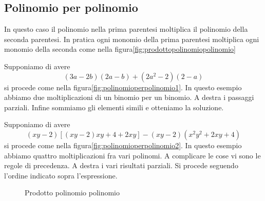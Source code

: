 \subsection{Polinomio per polinomio}
In questo caso il polinomio nella prima parentesi moltiplica il polinomio della seconda parentesi. In pratica ogni monomio della prima parentesi moltiplica ogni monomio della seconda come nella figura\nobs\vref{fig:prodottopolinomiopolinomio}

Supponiamo di avere \[(3a-2b)(2a-b)+(2a^2-2)(2-a)\]
si  procede come nella figura\nobs\vref{fig:polinomioperpolinomio1}. In questo esempio abbiamo due moltiplicazioni di un binomio per un binomio. A destra i passaggi parziali. Infine sommiamo  gli elementi simili e otteniamo la soluzione.


Supponiamo di avere \[(xy-2)[(xy-2)xy+4+2xy]-(xy-2)(x^2y^2+2xy+4)\]
si  procede come nella figura\nobs\vref{fig:polinomioperpolinomio2}. In questo esempio abbiamo quattro moltiplicazioni  fra vari polinomi. A complicare le cose vi sono le regole di precedenza. A destra i vari risultati parziali. Si procede seguendo l'ordine indicato sopra l'espressione. 
\begin{figure}
	\centering
	\caption{Prodotto polinomio polinomio}
	\label{fig:prodottopolinomiopolinomio}
\end{figure}
